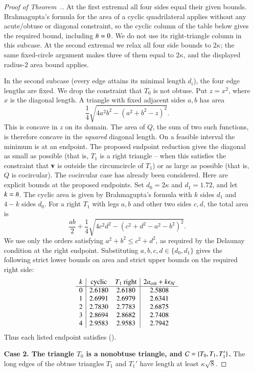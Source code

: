 \begin{proof}[Proof of Theorem~.]
At the first extremal all four sides equal their given bounds.
Brahmagupta's formula for the area of a cyclic quadrilateral applies
without any acute/obtuse or diagonal constraint, so the cyclic column
of the table below gives the required bound, including $\bar n=0$. We do
not use its right-triangle column in this subcase. At the second
extremal we relax all four side bounds to $2\kappa$; the same
fixed-circle argument makes three of them equal to $2\kappa$, and the
displayed radius-$2$ area bound applies.

In the second subcase (every edge attains its minimal length $d_i$),
the four edge lengths are fixed.  We drop the constraint that $T_0$ is
not obtuse. Put $z=x^2$, where $x$ is the diagonal length.  A triangle with
fixed adjacent sides $a,b$ has area
\[
\frac14\sqrt{4a^2b^2-(a^2+b^2-z)^2}.
\]
This is concave in $z$ on its domain.  The area of $Q$, the sum of two
such functions, is therefore concave in the \emph{squared}
diagonal length.  On a feasible interval the minimum is at an
endpoint.  The proposed endpoint reduction gives the diagonal as
small as possible (that is, $T_1$ is a right triangle -- when this
satisfies the constraint that ${\mathbf v}$ is outside the circumcircle of
$T_1$) or as large as possible (that is, $Q$ is cocircular).  The
cocircular case has already been considered.
Here are explicit bounds at the proposed endpoints.  Set $d_0=2\kappa$
and $d_1=1.72$, and let $k=\bar n$.  The cyclic area is given by
Brahmagupta's formula with $k$ sides $d_1$ and $4-k$ sides $d_0$.
For a right $T_1$ with legs $a,b$ and other two sides $c,d$,
the total area is
\[
\frac{ab}{2}+\frac14
\sqrt{4c^2d^2-(c^2+d^2-a^2-b^2)^2}.
\]
We use only the orders satisfying $a^2+b^2\le c^2+d^2$, as
required by the Delaunay condition at the right endpoint.  Substituting
$a,b,c,d\in\{d_0,d_1\}$ gives the following strict lower bounds on
area and strict upper bounds on the required right side:
\[
\begin{array}{c|cc|c}
k&\text{cyclic}&T_1\text{ right}&2a_\text{crit}+k\epsilon_{\mathcal N}\\ \hline
0&2.6180&2.6180&2.5808\\
1&2.6991&2.6979&2.6341\\
2&2.7830&2.7783&2.6875\\
3&2.8694&2.8682&2.7408\\
4&2.9583&2.9583&2.7942
\end{array}
\]
Thus each listed endpoint satisfies ().

{\bf Case 2. The triangle $T_0$ is a nonobtuse triangle, and
  $\mathcal C=\{T_0,T_1,T_1'\}$.}  
The long edges of the obtuse triangles
$T_1$ and $T_1'$ have length at least $\kappa\sqrt{8}$.


\end{proof}
